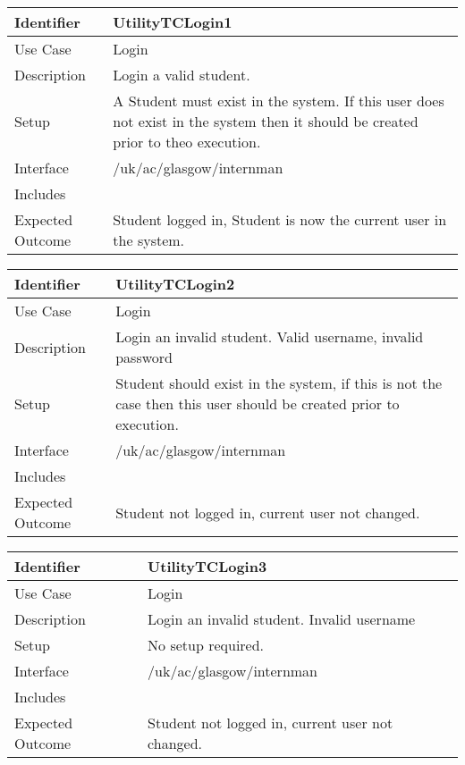 \vspace{2em}

\begin{tabularx}{\textwidth}{|T|L|}
\hline
Identifier & UtilityTCLogin1\\
\hline
Use Case & Login\\
\hline
Description & Login a valid student. \\
\hline
Setup & A Student must exist in the system. If this user does not
exist in the system then it should be created prior to theo execution. \\
\hline
Interface & /uk/ac/glasgow/internman \\
\hline
Includes & \\
\hline
Expected Outcome & Student logged in, Student is now the current user
in the system.\\
\hline
\end{tabularx}

\vspace{2em}

\begin{tabularx}{\textwidth}{|T|L|}
\hline
Identifier & UtilityTCLogin2\\
\hline
Use Case & Login \\
\hline
Description & Login an invalid student. Valid username, invalid password\\
\hline
Setup & Student should exist in the system, if this is not the case
then this user should be created prior to execution.\\
\hline
Interface & /uk/ac/glasgow/internman \\
\hline
Includes & \\
\hline
Expected Outcome & Student not logged in, current user not changed.\\
\hline
\end{tabularx}

\vspace{2em}

\begin{tabularx}{\textwidth}{|T|L|}
\hline
Identifier & UtilityTCLogin3\\
\hline
Use Case & Login \\
\hline
Description & Login an invalid student. Invalid username\\
\hline
Setup & No setup required.\\
\hline
Interface & /uk/ac/glasgow/internman \\
\hline
Includes & \\
\hline
Expected Outcome & Student not logged in, current user not changed.\\
\hline
\end{tabularx}

